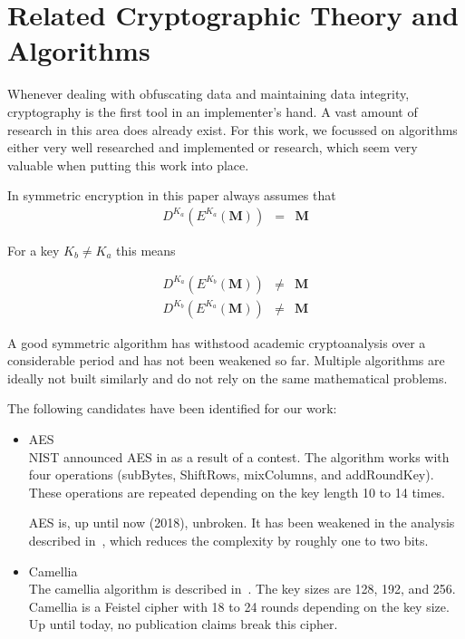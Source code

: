 \chapter{Related Cryptographic Theory and Algorithms}\label{sec:cryptoResearch}

Whenever dealing with obfuscating data and maintaining data integrity, cryptography is the first tool in an implementer's hand. A vast amount of research in this area does already exist. For this work, we focussed on algorithms either very well researched and implemented or research, which seem very valuable when putting this work into place. 

In symmetric encryption in this paper always assumes that
\begin{eqnarray}
	D^{K_a}\left(E^{K_a}\left(\mathbf{M}\right)\right) & = & \mathbf{M}
\end{eqnarray} 

For a key $K_b\neq K_a$ this means

\begin{eqnarray}
	D^{K_a}\left(E^{K_b}\left(\mathbf{M}\right)\right) & \neq & \mathbf{M}\\
	D^{K_b}\left(E^{K_a}\left(\mathbf{M}\right)\right) & \neq & \mathbf{M}
\end{eqnarray} 

A good symmetric algorithm has withstood academic cryptoanalysis over a considerable period and has not been weakened so far. Multiple algorithms are ideally not built similarly and do not rely on the same mathematical problems.

The following candidates have been identified for our work:
\begin{itemize}
	\item AES\\
	NIST announced AES in \citeyear{standard2001announcing} as a result of a contest. The algorithm works with four operations (subBytes, ShiftRows, mixColumns, and addRoundKey). These operations are repeated depending on the key length 10 to 14 times. 
	
	AES is, up until now (2018), unbroken. It has been weakened in the analysis described in~\cite{tao2015improving}, which reduces the complexity by roughly one to two bits. 
	
	\item Camellia\\
	The camellia algorithm is described in~\cite{rfc3713}. The key sizes are 128, 192, and 256. Camellia is a Feistel cipher with 18 to 24 rounds depending on the key size. Up until today, no publication claims break this cipher. 
\end{itemize}

